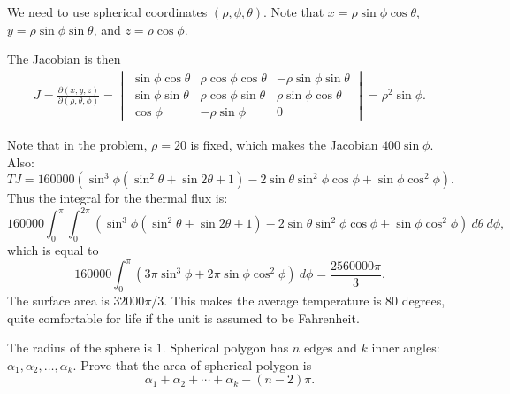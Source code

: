 \documentclass[12pt,a4paper]{memoir}
\theoremstyle{definition}
\begin{document}
\begin{solution}[name={Solution by Rchokler}]
	We need to use spherical coordinates $(\rho,\phi,\theta)$. Note that $x=\rho\sin\phi\cos\theta$, $y=\rho\sin\phi\sin\theta$, and $z=\rho\cos\phi$.
	
	The Jacobian is then 
	\begin{align*}
		J=\frac{\partial(x,y,z)}{\partial(\rho,\theta,\phi)}=
		\begin{vmatrix}
			\sin\phi\cos\theta & \rho\cos\phi\cos\theta & -\rho\sin\phi\sin\theta\\
			\sin\phi\sin\theta & \rho\cos\phi\sin\theta & \rho\sin\phi\cos\theta\\
			\cos\phi & -\rho\sin\phi & 0
		\end{vmatrix}=\rho^2\sin\phi.
	\end{align*}
	
	Note that in the problem, $\rho=20$ is fixed, which makes the Jacobian $400\sin\phi$.
	Also:
	\[TJ=160000\left(\sin^3\phi\left(\sin ^2\theta+\sin 2\theta+1\right)-2\sin\theta\sin^2\phi\cos\phi+\sin\phi\cos^2\phi\right).\]
	Thus the integral for the thermal flux is:
	\[160000\int_0^\pi\int_0^{2\pi}\left(\sin^3\phi\left(\sin ^2\theta+\sin 2\theta+1\right)-2\sin\theta\sin^2\phi\cos\phi+\sin\phi\cos^2\phi\right)\ d\theta\ d\phi,\]
	which is equal to \[160000\int_0^\pi(3\pi\sin^3\phi+2\pi\sin\phi\cos^2\phi)\ d\phi=\frac{2560000\pi}{3}.\]
	The surface area is $32000\pi/3$. This makes the average temperature is $80$ degrees, quite comfortable for life if the unit is assumed to be Fahrenheit.
\end{solution}





\begin{question}[name={Area of Spherical Polygon}] 
	The radius of the sphere is $1$. Spherical polygon has $n$ edges and $k$ inner angles: $\alpha_1, \alpha_2, \dots,\alpha_k$.
	Prove that the area of spherical polygon is $$\alpha_1+\alpha_2+\cdots+\alpha_k-(n-2)\pi.$$
\end{question}
\end{document}
